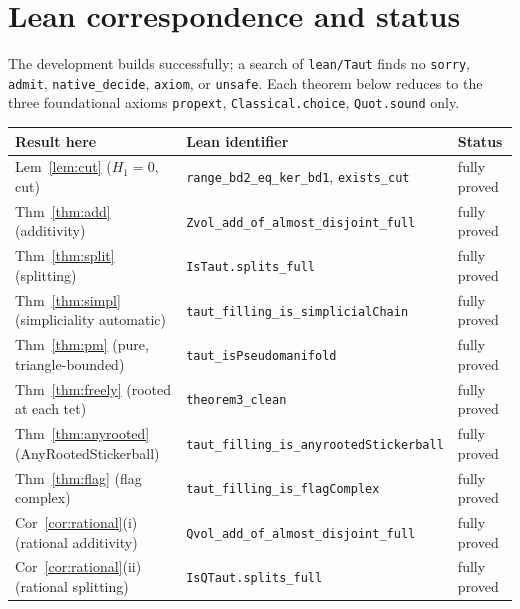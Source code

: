 \documentclass[11pt]{article}
\theoremstyle{plain}
\theoremstyle{definition}
\theoremstyle{remark}
\newcommand{\code}[1]{\texttt{#1}}
\begin{document}
\section{Lean correspondence and status}\label{sec:status}

The development builds successfully; a search of \code{lean/Taut} finds no \code{sorry},
\code{admit}, \code{native\_decide}, \code{axiom}, or \code{unsafe}. Each theorem below
reduces to the three foundational axioms \code{propext}, \code{Classical.choice},
\code{Quot.sound} only.

\begin{center}\small
\begin{tabular}{lll}
\hline
Result here & Lean identifier & Status\\
\hline
Lem~\ref{lem:cut} ($H_1=0$, cut) & \code{range\_bd2\_eq\_ker\_bd1}, \code{exists\_cut} & fully proved\\
Thm~\ref{thm:add} (additivity) & \code{Zvol\_add\_of\_almost\_disjoint\_full} & fully proved\\
Thm~\ref{thm:split} (splitting) & \code{IsTaut.splits\_full} & fully proved\\
Thm~\ref{thm:simpl} (simpliciality automatic) & \code{taut\_filling\_is\_simplicialChain} & fully proved\\
Thm~\ref{thm:pm} (pure, triangle-bounded) & \code{taut\_isPseudomanifold} & fully proved\\
Thm~\ref{thm:freely} (rooted at each tet) & \code{theorem3\_clean} & fully proved\\
Thm~\ref{thm:anyrooted} (AnyRootedStickerball) & \code{taut\_filling\_is\_anyrootedStickerball} & fully proved\\
Thm~\ref{thm:flag} (flag complex) & \code{taut\_filling\_is\_flagComplex} & fully proved\\
Cor~\ref{cor:rational}(i) (rational additivity) & \code{Qvol\_add\_of\_almost\_disjoint\_full} & fully proved\\
Cor~\ref{cor:rational}(ii) (rational splitting) & \code{IsQTaut.splits\_full} & fully proved\\
\hline
\end{tabular}
\end{center}
\end{document}
